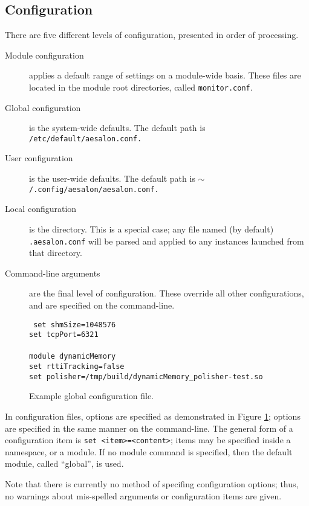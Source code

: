 \subsection{Configuration}
There are five different levels of configuration, presented in order of processing.
\begin{description}
 \item[Module configuration] applies a default range of settings on a module-wide basis. These files are located in the
module root directories, called \texttt{monitor.conf}.
 \item[Global configuration] is the system-wide defaults. The default path is \texttt{/etc/default/aesalon.conf.}
 \item[User configuration] is the user-wide defaults. The default path is \texttt{$\sim$/.config/aesalon/aesalon.conf.}
 \item[Local configuration] is the directory. This is a special case; any file named (by default) \texttt{.aesalon.conf}
  will be parsed and applied to any instances launched from that directory.
 \item[Command-line arguments] are the final level of configuration. These override all other configurations, and are
specified
  on the command-line.
\end{description}

\begin{figure}[t]
  \small{\texttt{%
set shmSize=1048576 \\
set tcpPort=6321 \\
\\
module dynamicMemory \\
set rttiTracking=false \\
set polisher=/tmp/build/dynamicMemory\_polisher-test.so
  }}
  \caption{Example global configuration file.\label{exampleconfigfile}}
\end{figure}

In configuration files, options are specified as demonstrated in Figure \ref{exampleconfigfile}; options are
specified
in the same manner on the command-line. The general form of a configuration item is \texttt{set <item>=<content>};
items may be specified inside a namespace, or a module. If no module command is specified, then the default module,
called ``global'', is used.

Note that there is currently no method of specifing configuration options; thus, no warnings about mis-spelled arguments
or configuration items are given.


